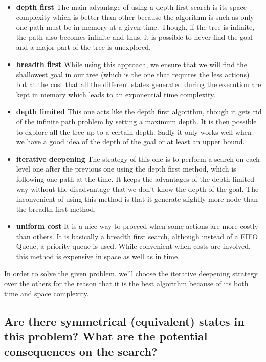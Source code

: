 \documentclass[a4paper,10pt]{article}
\begin{document}
	\begin{itemize}
		\item \textbf{depth first} The main advantage of using a depth first search is its space complexity which is better than other because the algorithm is such as only one path must be in memory at a given time. 
		Though, if the tree is infinite, the path also becomes infinite and thus, it is possible to never find the goal and a major part of the tree is unexplored.
		\item \textbf{breadth first} While using this approach, we ensure that we will find the shallowest goal in our tree (which is the one that requires the less actions) but at the cost that all the different states generated during the execution are kept in memory which leads to an exponential time complexity.
		\item \textbf{depth limited} This one acts like the depth first algorithm, though it gets rid of the infinite path problem by setting a maximum depth. It is then possible to explore all the tree up to a certain depth. 
		Sadly it only works well when we have a good idea of the depth of the goal or at least an upper bound.
		\item \textbf{iterative deepening} The strategy of this one is to perform a search on each level one after the previous one using the depth first method, which is following one path at the time. It keeps the advantages of the depth limited way without the disadvantage that we don't know the depth of the goal.
		The inconvenient of using this method is that it generate slightly more node than the breadth first method.
		\item \textbf{uniform cost} It is a nice way to proceed when some actions are more costly than others. It is basically a breadth first search, although instead of a FIFO Queue, a priority queue is used.
		While convenient when costs are involved, this method is expensive in space as well as in time.\\
	\end{itemize}
	In order to solve the given problem, we'll choose the iterative deepening strategy over the others for the reason that it is the best algorithm because of its both time and space complexity.
	
	\subsection{Are there symmetrical (equivalent) states in this problem? What are the potential consequences on the search?}
	
\end{document}
